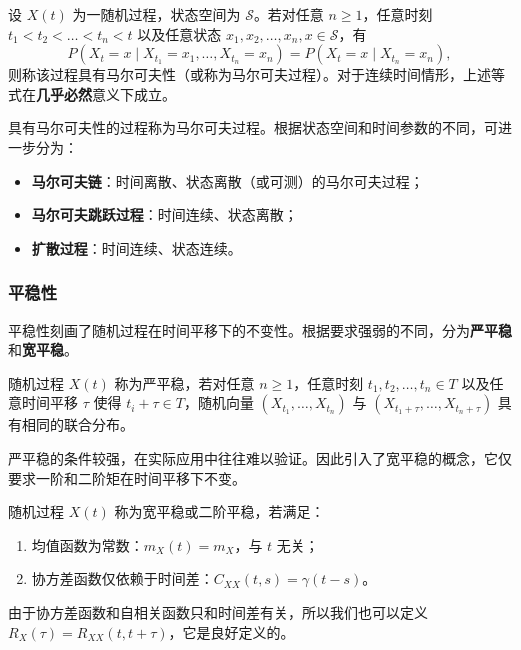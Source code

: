 \begin{definition}[马尔可夫性]
设 \(X(t)\) 为一随机过程，状态空间为 \(\mathcal{S}\)。若对任意 \(n \ge 1\)，任意时刻 \(t_1 < t_2 < \dots < t_n < t\) 以及任意状态 \(x_1, x_2, \dots, x_n, x \in \mathcal{S}\)，有
\[
P(X_t = x \mid X_{t_1} = x_1, \dots, X_{t_n} = x_n) = P(X_t = x \mid X_{t_n} = x_n),
\]
则称该过程具有马尔可夫性（或称为马尔可夫过程）。对于连续时间情形，上述等式在\textbf{几乎必然}意义下成立。
\end{definition}

具有马尔可夫性的过程称为马尔可夫过程。根据状态空间和时间参数的不同，可进一步分为：
\begin{itemize}
    \item \textbf{马尔可夫链}：时间离散、状态离散（或可测）的马尔可夫过程；
    \item \textbf{马尔可夫跳跃过程}：时间连续、状态离散；
    \item \textbf{扩散过程}：时间连续、状态连续。
\end{itemize}

\subsubsection{平稳性}

平稳性刻画了随机过程在时间平移下的不变性。根据要求强弱的不同，分为\textbf{严平稳}和\textbf{宽平稳}。

\begin{definition}[严平稳]
随机过程 \(X(t)\) 称为严平稳，若对任意 \(n \ge 1\)，任意时刻 \(t_1, t_2, \dots, t_n \in T\) 以及任意时间平移 \(\tau\) 使得 \(t_i + \tau \in T\)，随机向量 \((X_{t_1}, \dots, X_{t_n})\) 与 \((X_{t_1+\tau}, \dots, X_{t_n+\tau})\) 具有相同的联合分布。
\end{definition}

严平稳的条件较强，在实际应用中往往难以验证。因此引入了宽平稳的概念，它仅要求一阶和二阶矩在时间平移下不变。

\begin{definition}[宽平稳]
随机过程 \(X(t)\) 称为宽平稳或二阶平稳，若满足：
\begin{enumerate}
    \item 均值函数为常数：\(m_{X}(t) = m_X\)，与 \(t\) 无关；
    \item 协方差函数仅依赖于时间差：\(C_{XX}(t, s) = \gamma(t-s)\)。
\end{enumerate}
\end{definition}

由于协方差函数和自相关函数只和时间差有关，所以我们也可以定义\(R_X(\tau)=R_{XX}(t,t+\tau)\)，它是良好定义的。

